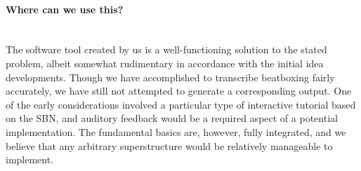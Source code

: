 \paragraph{Where can we use this?} \hspace{0pt} \\


The software tool created by us is a well-functioning solution to the stated problem, albeit somewhat rudimentary in accordance with the initial idea developments. Though we have accomplished to transcribe beatboxing fairly accurately, we have still not attempted to generate a corresponding output. One of the early considerations involved a particular type of interactive tutorial based on the SBN, and auditory feedback would be a required aspect of a potential implementation. The fundamental basics are, however, fully integrated, and we believe that any arbitrary superstructure would be relatively manageable to implement.
